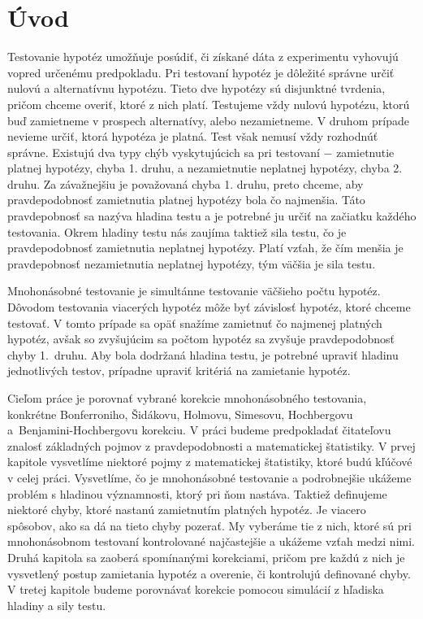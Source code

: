 \chapter*{Úvod}

Testovanie hypotéz umožňuje posúdiť, či získané dáta z experimentu vyhovujú vopred určenému predpokladu. 
Pri testovaní hypotéz je dôležité správne určiť nulovú a alternatívnu hypotézu. 
Tieto dve hypotézy sú disjunktné tvrdenia, pričom chceme overiť, ktoré z nich platí. 
Testujeme vždy nulovú hypotézu, ktorú buď zamietneme v prospech alternatívy, alebo nezamietneme. 
V druhom prípade nevieme určiť, ktorá hypotéza je platná. 
Test však nemusí vždy rozhodnúť správne. 
Existujú dva typy chýb vyskytujúcich sa pri testovaní $-$ zamietnutie platnej hypotézy, chyba 1. druhu, a 
nezamietnutie neplatnej hypotézy, chyba 2. druhu. 
Za závažnejšiu je považovaná chyba 1. druhu, preto chceme, aby pravdepodobnosť zamietnutia platnej hypotézy bola čo najmenšia. 
Táto pravdepobnosť sa nazýva hladina testu a je potrebné ju určiť na začiatku každého testovania. 
Okrem hladiny testu nás zaujíma taktiež sila testu, 
čo je pravdepodobnosť zamietnutia neplatnej hypotézy. 
Platí vzťah, že čím menšia je pravdepobnosť nezamietnutia neplatnej hypotézy, tým väčšia je sila testu. 

Mnohonásobné testovanie je simultánne testovanie väčšieho počtu hypotéz. 
Dôvodom testovania viacerých hypotéz môže byť závislosť hypotéz, ktoré chceme testovať. 
V tomto prípade sa opäť snažíme zamietnuť čo najmenej platných hypotéz, avšak so zvyšujúcim sa počtom hypotéz sa zvyšuje pravdepodobnosť chyby 1.~druhu. 
Aby bola dodržaná hladina testu, je potrebné upraviť hladinu jednotlivých testov, 
prípadne upraviť kritériá na zamietanie hypotéz. 

Cieľom práce je porovnať vybrané korekcie mnohonásobného testovania, konkrétne Bonferroniho, 
Šidákovu, Holmovu, Simesovu, Hochbergovu a~Benjamini-Hochbergovu korekciu. 
V práci budeme predpokladať čitateľovu znalosť základných pojmov z pravdepodobnosti a matematickej štatistiky. 
V prvej kapitole vysvetlíme niektoré pojmy z matematickej štatistiky, ktoré budú kľúčové v celej práci. 
Vysvetlíme, čo je mnohonásobné testovanie a podrobnejšie ukážeme problém s hladinou významnosti, 
ktorý pri ňom nastáva. 
Taktiež definujeme niektoré chyby, ktoré nastanú zamietnutím platných hypotéz. 
Je viacero spôsobov, ako sa dá na tieto chyby pozerať. 
My vyberáme tie z nich, ktoré sú pri mnohonásobnom testovaní kontrolované najčastejšie a ukážeme vzťah medzi nimi.
Druhá kapitola sa zaoberá spomínanými korekciami, 
pričom pre každú z nich je vysvetlený postup zamietania hypotéz 
a overenie, či kontrolujú definované chyby. 
V tretej kapitole budeme porovnávať korekcie pomocou simulácií z hľadiska hladiny a sily testu. 

